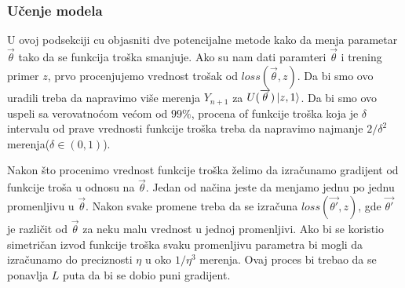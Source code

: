 \documentclass[12pt, letterpaper, oneside]{article}
\begin{document}
\subsubsection{Učenje modela}
U ovoj podsekciji cu objasniti dve potencijalne metode kako da menja parametar $\overrightarrow{\theta}$ tako da se funkcija troška smanjuje.
Ako su nam dati paramteri $\overrightarrow{\theta}$ i trening primer $z$, prvo procenjujemo vrednost trošak od $\mathit{loss}(\overrightarrow{\theta},z)$.
Da bi smo ovo uradili treba da napravimo više merenja $Y_{n+1}$ za $U(\overrightarrow{\theta})\Ket{z,1}$.
Da bi smo ovo uspeli sa verovatnoćom većom od $99\%$, procena of funkcije troška koja je $\delta$ intervalu od prave vrednosti funkcije troška
treba da napravimo najmanje $2/\delta^2$ merenja($\delta \in (0,1)$).

Nakon što procenimo vrednost funkcije troška želimo da izračunamo gradijent od funkcije troša u odnosu na $\overrightarrow{\theta}$.
Jedan od načina jeste da menjamo jednu po jednu promenljivu u $\overrightarrow{\theta}$. Nakon svake promene treba da se izračuna
$\mathit{loss}(\overrightarrow{\theta'},z)$, gde $\overrightarrow{\theta'}$ je različit od $\overrightarrow{\theta}$ za neku malu vrednost u jednoj promenljivi.
Ako bi se koristio simetričan izvod funkcije troška svaku promenljivu parametra bi mogli da izračunamo do preciznosti $\eta$ u oko $1/\eta^3$ merenja.
Ovaj proces bi trebao da se ponavlja $L$ puta da bi se dobio puni gradijent.
\end{document}
